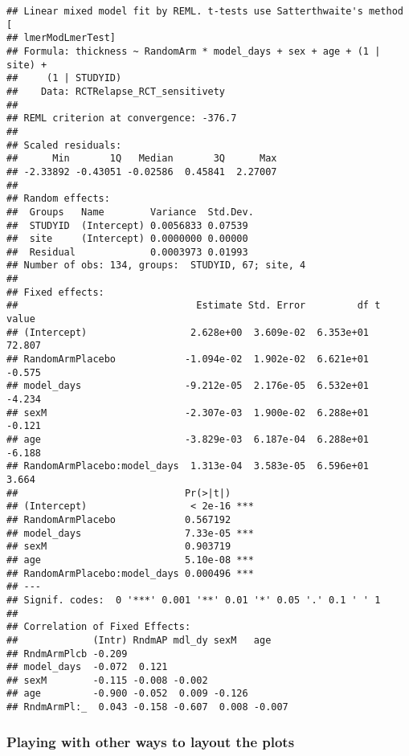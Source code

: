 \documentclass[]{article}
\theoremstyle{definition}
\theoremstyle{definition}
\theoremstyle{definition}
\theoremstyle{remark}
\begin{document}
\begin{verbatim}
## Linear mixed model fit by REML. t-tests use Satterthwaite's method [
## lmerModLmerTest]
## Formula: thickness ~ RandomArm * model_days + sex + age + (1 | site) +  
##     (1 | STUDYID)
##    Data: RCTRelapse_RCT_sensitivety
## 
## REML criterion at convergence: -376.7
## 
## Scaled residuals: 
##      Min       1Q   Median       3Q      Max 
## -2.33892 -0.43051 -0.02586  0.45841  2.27007 
## 
## Random effects:
##  Groups   Name        Variance  Std.Dev.
##  STUDYID  (Intercept) 0.0056833 0.07539 
##  site     (Intercept) 0.0000000 0.00000 
##  Residual             0.0003973 0.01993 
## Number of obs: 134, groups:  STUDYID, 67; site, 4
## 
## Fixed effects:
##                               Estimate Std. Error         df t value
## (Intercept)                  2.628e+00  3.609e-02  6.353e+01  72.807
## RandomArmPlacebo            -1.094e-02  1.902e-02  6.621e+01  -0.575
## model_days                  -9.212e-05  2.176e-05  6.532e+01  -4.234
## sexM                        -2.307e-03  1.900e-02  6.288e+01  -0.121
## age                         -3.829e-03  6.187e-04  6.288e+01  -6.188
## RandomArmPlacebo:model_days  1.313e-04  3.583e-05  6.596e+01   3.664
##                             Pr(>|t|)    
## (Intercept)                  < 2e-16 ***
## RandomArmPlacebo            0.567192    
## model_days                  7.33e-05 ***
## sexM                        0.903719    
## age                         5.10e-08 ***
## RandomArmPlacebo:model_days 0.000496 ***
## ---
## Signif. codes:  0 '***' 0.001 '**' 0.01 '*' 0.05 '.' 0.1 ' ' 1
## 
## Correlation of Fixed Effects:
##             (Intr) RndmAP mdl_dy sexM   age   
## RndmArmPlcb -0.209                            
## model_days  -0.072  0.121                     
## sexM        -0.115 -0.008 -0.002              
## age         -0.900 -0.052  0.009 -0.126       
## RndmArmPl:_  0.043 -0.158 -0.607  0.008 -0.007
\end{verbatim}

\subsubsection{Playing with other ways to layout the
plots}\label{playing-with-other-ways-to-layout-the-plots}
\end{document}
